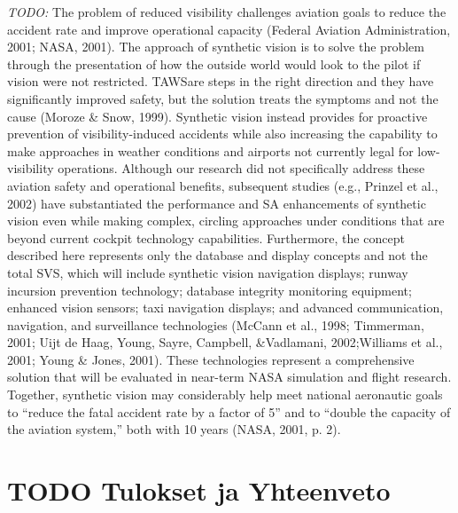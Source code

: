 \documentclass[utf8,bachelor,manualbib]{gradu3}
\begin{document}
\emph{TODO:}
The problem of reduced visibility challenges aviation goals to reduce the accident
rate and improve operational capacity (Federal Aviation Administration, 2001;
NASA, 2001). The approach of synthetic vision is to solve the problem through the
presentation of how the outside world would look to the pilot if vision were not restricted.
TAWSare steps in the right direction and they have significantly improved
safety, but the solution treats the symptoms and not the cause (Moroze \& Snow,
1999). Synthetic vision instead provides for proactive prevention of visibility-induced
accidents while also increasing the capability to make approaches in
weather conditions and airports not currently legal for low-visibility operations.
Although our research did not specifically address these aviation safety and operational
benefits, subsequent studies (e.g., Prinzel et al., 2002) have substantiated the
performance and SA enhancements of synthetic vision even while making complex,
circling approaches under conditions that are beyond current cockpit technology
capabilities. Furthermore, the concept described here represents only the
database and display concepts and not the total SVS, which will include synthetic
vision navigation displays; runway incursion prevention technology; database integrity
monitoring equipment; enhanced vision sensors; taxi navigation displays;
and advanced communication, navigation, and surveillance technologies
(McCann et al., 1998; Timmerman, 2001; Uijt de Haag, Young, Sayre, Campbell,
\&Vadlamani, 2002;Williams et al., 2001; Young \& Jones, 2001). These technologies
represent a comprehensive solution that will be evaluated in near-term NASA
simulation and flight research. Together, synthetic vision may considerably help
meet national aeronautic goals to “reduce the fatal accident rate by a factor of 5”
and to “double the capacity of the aviation system,” both with 10 years (NASA,
2001, p. 2). \citep{prinzel2004}
























\chapter{TODO Tulokset ja Yhteenveto}
\end{document}
